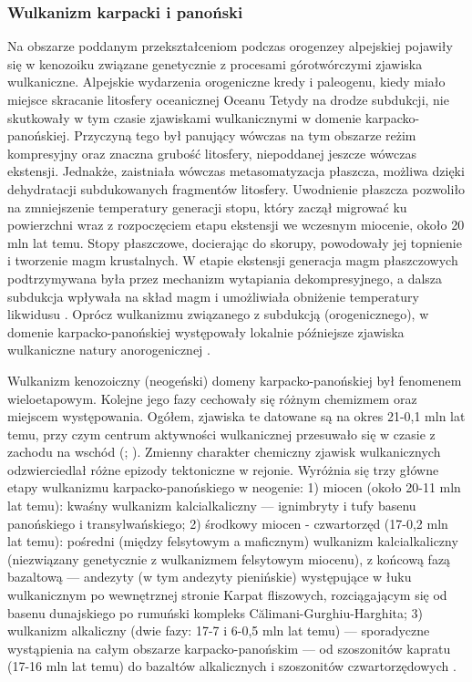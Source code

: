 \documentclass[11.5pt,twoside]{report}
\begin{document}
 \subsubsection{Wulkanizm karpacki i panoński}
 
 Na obszarze poddanym przekształceniom podczas orogenzey alpejskiej pojawiły się w kenozoiku związane genetycznie z procesami górotwórczymi zjawiska wulkaniczne. Alpejskie wydarzenia orogeniczne kredy i paleogenu, kiedy miało miejsce skracanie litosfery oceanicznej Oceanu Tetydy na drodze subdukcji, nie skutkowały w tym czasie zjawiskami wulkanicznymi w domenie karpacko-panońskiej. Przyczyną tego był panujący wówczas na tym obszarze reżim kompresyjny oraz znaczna grubość litosfery, niepoddanej jeszcze wówczas ekstensji. Jednakże, zaistniała wówczas metasomatyzacja płaszcza, możliwa dzięki dehydratacji subdukowanych fragmentów litosfery. Uwodnienie płaszcza pozwoliło na zmniejszenie temperatury generacji stopu, który zaczął migrować ku powierzchni wraz z rozpoczęciem etapu ekstensji we wczesnym miocenie, około 20 mln lat temu. Stopy płaszczowe, docierając do skorupy, powodowały jej topnienie i tworzenie magm krustalnych. W etapie ekstensji generacja magm płaszczowych podtrzymywana była przez mechanizm wytapiania dekompresyjnego, a dalsza subdukcja wpływała na skład magm i umożliwiała obniżenie temperatury likwidusu \parencite{Harangi.2007}. Oprócz wulkanizmu związanego z subdukcją (orogenicznego), w domenie karpacko-panońskiej występowały lokalnie pó\'{z}niejsze zjawiska wulkaniczne natury anorogenicznej \parencite{Wilson.2006}.
 
 
 Wulkanizm kenozoiczny (neogeński) domeny karpacko-panońskiej był fenomenem wieloetapowym. Kolejne jego fazy cechowały się różnym chemizmem oraz miejscem występowania. Ogółem, zjawiska te datowane są na okres 21-0,1 mln lat temu, przy czym centrum aktywności wulkanicznej przesuwało się w czasie z zachodu na wschód (\cite{Lexa.2010}; \cite{Pecskay.1995}). Zmienny charakter chemiczny zjawisk wulkanicznych odzwierciedlał różne epizody tektoniczne w rejonie. Wyróżnia się trzy główne etapy wulkanizmu karpacko-panońskiego w neogenie: 1) miocen (około 20-11 mln lat temu): kwaśny wulkanizm kalcialkaliczny --- ignimbryty i tufy basenu panońskiego i transylwańskiego; 2) środkowy miocen - czwartorzęd (17-0,2 mln lat temu): pośredni (między felsytowym a maficznym) wulkanizm kalcialkaliczny (niezwiązany genetycznie z wulkanizmem felsytowym miocenu), z końcową fazą bazaltową --- andezyty (w tym andezyty pienińskie) występujące w łuku wulkanicznym po wewnętrznej stronie Karpat fliszowych, rozciągającym się od basenu dunajskiego po rumuński kompleks Călimani-Gurghiu-Harghita; 3) wulkanizm alkaliczny (dwie fazy: 17-7 i 6-0,5 mln lat temu) --- sporadyczne wystąpienia na całym obszarze karpacko-panońskim --- od szoszonitów kapratu (17-16 mln lat temu) do bazaltów alkalicznych i szoszonitów czwartorzędowych \parencite{Pecskay.1995}.
 
\end{document}
